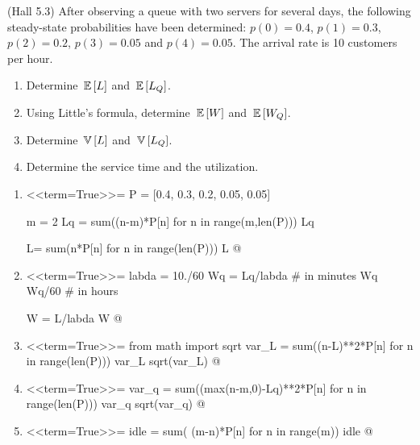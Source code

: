 \begin{question}(Hall 5.3) After observing a queue with two servers
  for several days, the following steady-state probabilities have been
  determined: $p(0)=0.4$, $p(1) = 0.3$, $p(2)=0.2$, $p(3)=0.05$ and
  $p(4)=0.05$. The arrival rate is 10 customers per hour.
  \begin{enumerate}
  \item Determine $\,\mathbb{E}\left[L\right]$ and  $\,\mathbb{E}\left[L_Q\right]$. 
  \item Using Little's formula, determine $\,\mathbb{E}\left[W\right]$ and $\,\mathbb{E}\left[W_Q\right]$. 
  \item Determine $\,\mathbb{V}\left[L\right]$ and $\,\mathbb{V}\left[L_Q\right]$.
  \item Determine the service time and the utilization.
  \end{enumerate}

  \begin{solution}
    \begin{enumerate}
    \item 
<<term=True>>=
P = [0.4, 0.3, 0.2, 0.05, 0.05]

m = 2
Lq = sum((n-m)*P[n] for n in range(m,len(P)))
Lq

L= sum(n*P[n] for n in range(len(P)))
L
@

\item 
<<term=True>>=
labda = 10./60
Wq = Lq/labda # in minutes
Wq
Wq/60 # in hours

W = L/labda
W
@ 

\item 
<<term=True>>=
from math import sqrt
var_L = sum((n-L)**2*P[n] for n in range(len(P)))
var_L
sqrt(var_L)
@ 

\item 
<<term=True>>=
var_q = sum((max(n-m,0)-Lq)**2*P[n] for n in range(len(P)))
var_q
sqrt(var_q)
@

\item 
<<term=True>>=
idle = sum( (m-n)*P[n] for n in range(m))
idle
@ 
  \end{enumerate}
    \end{solution}
\end{question}  

